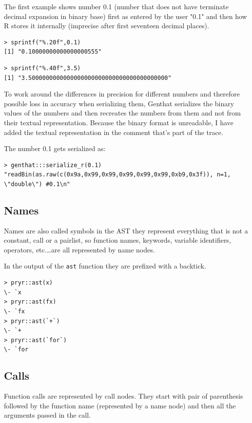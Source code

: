 \documentclass[thesis=B,english]{FITthesis}[2012/10/20]
\begin{document}
The first example shows number 0.1 (number that does not have terminate decimal expansion in binary base) first as entered by the user "0.1" and then how R stores it internally (imprecise after first seventeen decimal places).

\begin{verbatim}
> sprintf("%.20f",0.1)
[1] "0.10000000000000000555"
\end{verbatim}

\begin{verbatim}
> sprintf("%.40f",3.5)
[1] "3.5000000000000000000000000000000000000000"
\end{verbatim}

To work around the differences in precision for different numbers and therefore possible loss in accuracy when serializing them, Genthat serializes the binary values of the numbers and then recreates the numbers from them and not from their textual representation. Because the binary format is unreadable, I have added the textual representation in the comment that's part of the trace.

The number 0.1 gets serialized as:

\begin{verbatim}
> genthat:::serialize_r(0.1)
"readBin(as.raw(c(0x9a,0x99,0x99,0x99,0x99,0x99,0xb9,0x3f)), n=1, \"double\") #0.1\n"
\end{verbatim}

\subsection{Names}
Names are also called symbols in the AST they represent everything that is not a constant, call or a pairlist, so function names, keywords, variable identifiers, operators, etc.\ldots are all represented by name nodes.

In the output of the \verb|ast| function they are prefixed with a backtick.

\begin{verbatim}
> pryr::ast(x)
\- `x
> pryr::ast(fx)
\- `fx
> pryr::ast(`+`)
\- `+
> pryr::ast(`for`)
\- `for
\end{verbatim}

\subsection{Calls}
Function calls are represented by call nodes. They start with pair of parenthesis followed by the function name (represented by a name node) and then all the arguments passed in the call.
\end{document}
